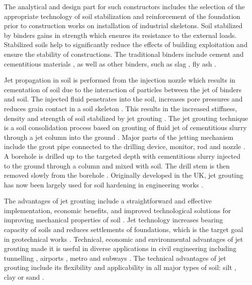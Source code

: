 \documentclass[USenglish,twocolumn]{article}
\begin{document}
The analytical and design part for such constructors includes the selection of the appropriate technology of soil stabilization and reinforcement of the foundation prior to construction works on installation of industrial skeletons. 
Soil stabilized by binders gains in strength which ensures its resistance to the external loads. Stabilized soils help to significantly reduce the effects of building exploitation and ensure the stability of constructions. The traditional binders include cement and cementitious materials \cite{Zhangetal2020}, as well as other binders, such as slag \cite{Proctor}, fly ash \cite{GilGolewski,GolewskiSzostak2022}. 

Jet propagation in soil is performed from the injection nozzle which results in cementation of soil due to the interaction of particles between the jet of binders and soil. The injected fluid penetrates into the soil, increases pore pressures and reduces grain contact in a soil skeleton \cite{Modonietal2006,Croceetal2014}. This results in the increased stiffness, density and strength of soil stabilized by jet grouting \cite{Modonietal2019}. The jet grouting technique is a soil consolidation process based on grouting of fluid jet of cementitious slurry through a jet column into the ground \cite{Mosiici}. Major parts of the jetting mechanism include the grout pipe connected to the drilling device, monitor, rod and nozzle \cite{CovilSkinner}. A borehole is drilled up to the targeted depth with cementitious slurry injected to the ground through a column and mixed with soil. The drill stem is then removed slowly from the borehole \cite{Njock}. Originally developed in the UK, jet grouting has now been largely used for soil hardening in engineering works \cite{Morey,Yoshida,Lunardi}. 

The advantages of jet grouting include a straightforward and effective implementation, economic benefits, and improved technological solutions for improving mechanical properties of soil \cite{modoni2012analysis}. Jet technology increases bearing capacity of soils and reduces settlements of foundations, which is the target goal in geotechnical works \cite{ModoniBzowka}. Technical, economic and environmental advantages of jet grouting \cite{Pinto} made it is useful in diverse applications in civil engineering including tunnelling \cite{Croce}, airports \cite{Hamidi,Lewis}, metro and subways \cite{Farretal2012,Chuetal,Mihalis}. The technical advantages of jet grouting include its flexibility \cite{Newman} and applicability in all major types of soil: silt \cite{Chuetal2012,HoHu}, clay \cite{Hoetal2005,Ho2009} or sand \cite{Hanetal2012}.
\end{document}
